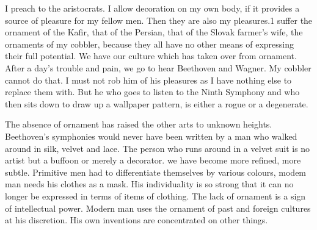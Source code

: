 \documentclass[a4paper]{article}
\begin{document}
I preach to the aristocrats. I allow decoration on my own body, if it provides a source of pleasure for my fellow men. Then they are also my pleasures.1 suffer the ornament of the Kafir, that of the Persian, that of the Slovak farmer’s wife, the ornaments of my cobbler, because they all have no other means of expressing their full potential. We have our culture which has taken over from ornament. After a day’s trouble and pain, we go to hear Beethoven and Wagner. My cobbler cannot do that. I must not rob him of his pleasures as I have nothing else to replace them with. But he who goes to listen to the Ninth Symphony and who then sits down to draw up a wallpaper pattern, is either a rogue or a degenerate.

The absence of ornament has raised the other arts to unknown heights. Beethoven’s symphonies would never have been written by a man who walked around in silk, velvet and lace. The person who runs around in a velvet suit is no artist but a buffoon or merely a decorator. we have become more refined, more subtle. Primitive men had to differentiate themselves by various colours, modem man needs his clothes as a mask. His individuality is so strong that it can no longer be expressed in terms of items of clothing. The lack of ornament is a sign of intellectual power. Modern man uses the ornament of past and foreign cultures at his discretion. His own inventions are concentrated on other things.
\end{document}
